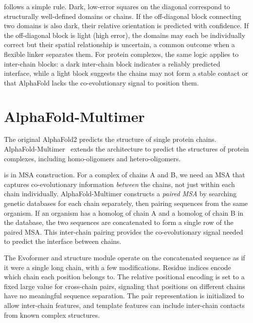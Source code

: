  follows a simple rule.
Dark, low-error squares on the diagonal correspond to structurally well-defined domains or chains.
If the off-diagonal block connecting two domains is also dark, their relative orientation is predicted with confidence.
If the off-diagonal block is light (high error), the domains may each be individually correct but their spatial relationship is uncertain, a common outcome when a flexible linker separates them.
For protein complexes, the same logic applies to inter-chain blocks: a dark inter-chain block indicates a reliably predicted interface, while a light block suggests the chains may not form a stable contact or that AlphaFold lacks the co-evolutionary signal to position them.


\section{AlphaFold-Multimer}
\label{sec:af2-multimer}

The original AlphaFold2 predicts the structure of single protein chains.
AlphaFold-Multimer~\cite{evans2022} extends the architecture to predict the structures of protein complexes, including homo-oligomers and hetero-oligomers.

 is in MSA construction.
For a complex of chains A and B, we need an MSA that captures co-evolutionary information \emph{between} the chains, not just within each chain individually.
AlphaFold-Multimer constructs a \emph{paired MSA} by searching genetic databases for each chain separately, then pairing sequences from the same organism.
If an organism has a homolog of chain A and a homolog of chain B in the database, the two sequences are concatenated to form a single row of the paired MSA.
This inter-chain pairing provides the co-evolutionary signal needed to predict the interface between chains.

The Evoformer and structure module operate on the concatenated sequence as if it were a single long chain, with a few modifications.
Residue indices encode which chain each position belongs to.
The relative positional encoding is set to a fixed large value for cross-chain pairs, signaling that positions on different chains have no meaningful sequence separation.
The pair representation is initialized to allow inter-chain features, and template features can include inter-chain contacts from known complex structures.

